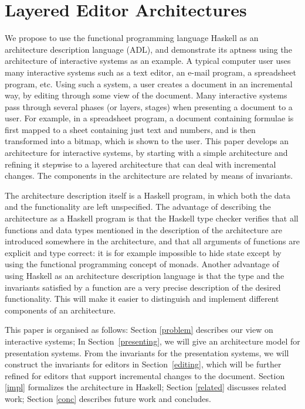 \documentclass[twoside,epsf]{report}
\begin{document}


\chapter{Layered Editor Architectures}
\label{chap:layeredArchs}


 


 

We propose to use the functional programming language Haskell as an architecture description language (ADL), and demonstrate its aptness using the architecture of interactive systems as an example. A typical computer user uses many interactive systems such as a text editor, an e-mail program, a spreadsheet program, etc. Using such a system, a user creates a document in an incremental way, by editing through some view of the document. Many interactive systems pass through several phases (or layers, stages) when presenting a document to a user. For example, in a spreadsheet program, a document containing formulae is first mapped to a sheet containing just text and numbers, and is then transformed into a bitmap, which is shown to the user. This paper develops an architecture for interactive systems, by starting with a simple architecture and refining it stepwise to a layered architecture that can deal with incremental changes. The components in the architecture are related by means of invariants.

The architecture description itself is a Haskell program, in which both the data and the functionality are left unspecified. The advantage of describing the architecture as a Haskell program is that the Haskell type checker verifies that all functions and data types mentioned in the description of the architecture are introduced somewhere in the architecture, and that all arguments of functions are explicit and type correct: it is for example impossible to hide state except by using the functional programming concept of monads. Another advantage of using Haskell as an architecture description language is that the type and the invariants satisfied by a function are a very precise description of the desired functionality. This will make it easier to distinguish and implement different components of an architecture.

This paper is organised as follows: Section \ref{problem} describes our view on interactive systems; In Section~\ref{presenting}, we will give an architecture model for presentation systems. From the invariants for the presentation systems, we will construct the invariants for editors in Section~\ref{editing}, which will be further refined for editors that support incremental changes to the document. Section \ref{impl} formalizes the architecture in Haskell; Section \ref{related} discusses related work; Section \ref{conc} describes future work and concludes.
\end{document}
